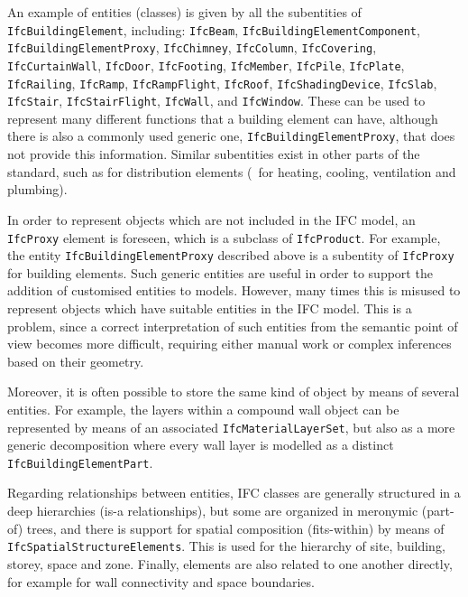 An example of entities (classes) is given by all the subentities of \texttt{Ifc\-Buil\-ding\-E\-le\-ment}, including: \texttt{Ifc\-Beam}, \texttt{Ifc\-Buil\-ding\-E\-le\-ment\-Com\-po\-nent}, \texttt{Ifc\-Buil\-ding\-E\-le\-ment\-Pro\-xy}, \texttt{Ifc\-Chim\-ney}, \texttt{Ifc\-Co\-lumn}, \texttt{Ifc\-Co\-ve\-ring}, \texttt{Ifc\-Cur\-tain\-Wall}, \texttt{Ifc\-Door}, \texttt{Ifc\-Foo\-ting}, \texttt{Ifc\-Mem\-ber}, \texttt{Ifc\-Pile}, \texttt{Ifc\-Plate}, \texttt{Ifc\-Rai\-ling}, \texttt{Ifc\-Ramp}, \texttt{Ifc\-Ramp\-Flight}, \texttt{Ifc\-Roof}, \texttt{Ifc\-Sha\-ding\-De\-vice}, \texttt{Ifc\-Slab}, \texttt{Ifc\-Stair}, \texttt{Ifc\-Stair\-Flight}, \texttt{Ifc\-Wall}, and \texttt{Ifc\-Win\-dow}.
These can be used to represent many different functions that a building element can have, although there is also a commonly used generic one, \texttt{IfcBuildingElementProxy}, that does not provide this information.
Similar subentities exist in other parts of the standard, such as for distribution elements (\eg\ for heating, cooling, ventilation and plumbing).

In order to represent objects which are not included in the IFC model, an \texttt{IfcProxy} element is foreseen, which is a subclass of \texttt{IfcProduct}.
For example, the entity \texttt{IfcBuildingElementProxy} described above is a subentity of \texttt{IfcProxy} for building elements.
Such generic entities are useful in order to support the addition of customised entities to models.
However, many times this is misused to represent objects which have suitable entities in the IFC model.
This is a problem, since a correct interpretation of such entities from the semantic point of view becomes more difficult, requiring either manual work or complex inferences based on their geometry.

Moreover, it is often possible to store the same kind of object by means of several entities.
For example, the layers within a compound wall object can be represented by means of an associated \texttt{IfcMaterialLayerSet}, but also as a more generic decomposition where every wall layer is modelled as a distinct \texttt{IfcBuildingElementPart}.

Regarding relationships between entities, IFC classes are generally structured in a deep hierarchies (is-a relationships), but some are organized in meronymic (part-of) trees, and there is support for spatial composition (fits-within) by means of \texttt{IfcSpatialStructureElements}.
This is used for the hierarchy of site, building, storey, space and zone.
Finally, elements are also related to one another directly, for example for wall connectivity and space boundaries.

